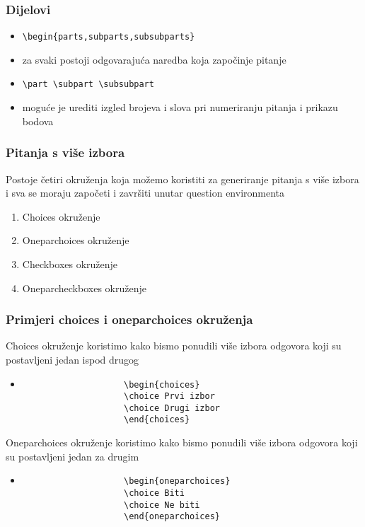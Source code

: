 \documentclass{beamer}
\begin{document}
    \begin{frame}[fragile]
    	\frametitle{Dijelovi}
    	\begin{itemize}
    		\item \begin{verbatim}\begin{parts,subparts,subsubparts}\end{verbatim}
    		\item za svaki postoji odgovarajuća naredba koja započinje pitanje
    		\item \begin{itemize}\begin{verbatim}\part \subpart \subsubpart\end{verbatim}\end{itemize}
    		\item moguće je urediti izgled brojeva i slova pri numeriranju pitanja i prikazu bodova
    	\end{itemize}	
    \end{frame}
    
    \begin{frame}
		\frametitle{Pitanja s više izbora}
		Postoje četiri okruženja koja možemo koristiti za generiranje pitanja s više izbora i sva se moraju započeti i završiti unutar question environmenta
			\begin{enumerate}
				\item{Choices okruženje}
				\item{Oneparchoices okruženje}
				\item{Checkboxes okruženje}
				\item{Oneparcheckboxes okruženje}
			\end{enumerate}
	\end{frame}
	
	\begin{frame}[fragile]
		\frametitle{Primjeri choices i oneparchoices okruženja}
		Choices okruženje koristimo kako bismo ponudili više izbora odgovora koji su postavljeni jedan ispod drugog
			\begin{itemize}
				\item
					\begin{verbatim}
					\begin{choices}
					\choice Prvi izbor
					\choice Drugi izbor
					\end{choices}
					\end{verbatim}
			\end{itemize}
		Oneparchoices okruženje koristimo kako bismo ponudili više izbora odgovora koji su postavljeni jedan za drugim
			\begin{itemize}
				\item
					\begin{verbatim}
					\begin{oneparchoices}
					\choice Biti
					\choice Ne biti
					\end{oneparchoices}
					\end{verbatim}
			\end{itemize}
	\end{frame}
\end{document}
